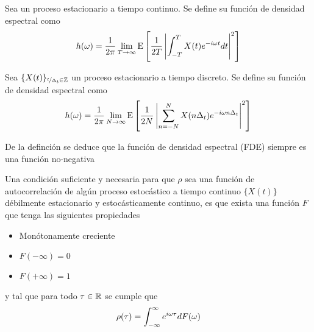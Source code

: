 \begin{definicion}
Sea \xt un proceso estacionario a tiempo continuo. Se define su {función de densidad 
espectral} como
\begin{equation}
h(\omega) = \frac{1}{2 \pi} \lim_{T\rightarrow \infty} \mathrm{E}\left[  \frac{1}{2T} 
\left|  \int_{-T}^{T} X(t) e^{-i \omega t} dt \right|^{2}  \right]
\label{txt_FDE_cont}
\end{equation}
\end{definicion}

\begin{definicion}
Sea $\{X(t)\}_{\nicefrac{t}{\Delta_t}\in \mathbb{Z}}$ un proceso estacionario a tiempo discreto. Se 
define su {función de densidad espectral} como
\begin{equation}
h(\omega) = \frac{1}{2 \pi} \lim_{N\rightarrow \infty} \mathrm{E}\left[  \frac{1}{2N} 
\left|  \sum_{n=-N}^{N} X(n \Delta_t) e^{-i \omega n \Delta_t} \right|^{2}  \right]
\label{txt_FDE_disc}
\end{equation}
\end{definicion}

De la definción se deduce que la función de densidad espectral (FDE) siempre es una función
no-negativa



\begin{teorema}
Una condición suficiente y necesaria para que $\rho$ sea una función de autocorrelación de 
algún proceso estocástico a tiempo continuo $\{X(t)\}$ débilmente estacionario y 
estocásticamente continuo, es que exista una función $F$ que tenga las siguientes propiedades
\begin{itemize}
\item Monótonamente creciente
\item $F(-\infty) = 0$
\item $F(+\infty) = 1$
\end{itemize}
y tal que para todo $\tau \in \mathbb{R}$ se cumple que
\begin{equation*}
\rho(\tau) = \int_{-\infty}^{\infty} e^{i \omega \tau} dF(\omega)
\end{equation*}
\label{t_wienerkhinchin}
\end{teorema}

